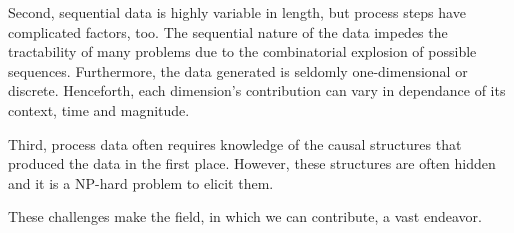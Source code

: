 \documentclass[./../../paper.tex]{subfiles}
\begin{document}
Second, sequential data is highly variable in length, but process steps have complicated factors, too. The sequential nature of the data impedes the tractability of many problems due to the combinatorial explosion of possible sequences. 
Furthermore, the data generated is seldomly one-dimensional or discrete. Henceforth, each dimension's contribution can vary in dependance of its context, time and magnitude. 

Third, process data often requires knowledge of the causal structures that produced the data in the first place. However, these structures are often hidden and it is a NP-hard problem to elicit them\cite{wang_Efficientrecoverymissing_2013}.

These challenges make the field, in which we can contribute, a vast endeavor. 
\end{document}

